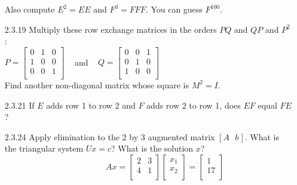 \documentclass[10pt,twoside,reqno]{article}
\begin{document}
\begin{enumerate}
Also compute $E^2 = EE$ and $F^3 = FFF$. You can guess $F^{100}$. 
\vspace{3mm}
\item[2.3.19]Multiply these row exchange matrices in the orders $PQ$ and $QP$ and $P^2$ : \\
\vspace{3mm}
\hspace{105pt}
$
$$
P=
\begin{bmatrix}
0&1&0\\
1&0&0\\
0&0&1\\
\end{bmatrix}
\hspace{10pt}
$$
$
and
$
$$
\hspace{10pt}
Q=
\begin{bmatrix}
0&0&1\\
0&1&0\\
1&0&0\\
\end{bmatrix}
$$
$
\vspace{3mm}\\
Find another non-diagonal matrix whose square is $M^2 = I$.
\vspace{3mm}
\item[2.3.21]If $E$ adds row 1 to row 2 and $F$ adds row 2 to row 1, does $EF$ equal $FE$? \\
\vspace{3mm}
\item[2.3.24]Apply elimination to the 2 by 3 augmented matrix $[A\hspace{8pt}b\hspace{1pt}]$. What is the triangular system $U x = c$? What is the solution $x$? \\
\vspace{3mm}
$
$$
\hspace{145pt}
Ax=
\begin{bmatrix}
2&3\\
4&1\\
\end{bmatrix}
\begin{bmatrix}
x_{1}\\
x_{2}\\
\end{bmatrix}
=
\begin{bmatrix}
1\\
17\\
\end{bmatrix}
$$
$
\vspace{3mm}
\end{enumerate}
\end{document}
